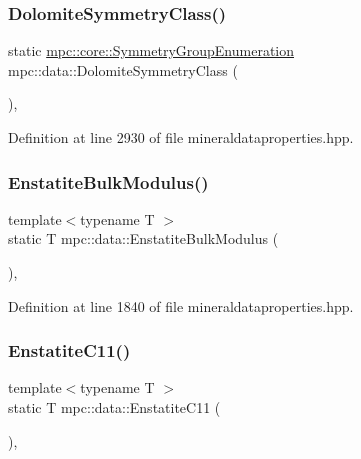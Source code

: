 \subsubsection{\texorpdfstring{Dolomite\+Symmetry\+Class()}{DolomiteSymmetryClass()}}
{\footnotesize\ttfamily static \mbox{\hyperlink{namespacempc_1_1core_a9d979684062547055a0ef5c13077bad8}{mpc\+::core\+::\+Symmetry\+Group\+Enumeration}} mpc\+::data\+::\+Dolomite\+Symmetry\+Class (\begin{DoxyParamCaption}{ }\end{DoxyParamCaption})\hspace{0.3cm}{\ttfamily [inline]}, {\ttfamily [static]}}



Definition at line 2930 of file mineraldataproperties.\+hpp.

\mbox{\label{namespacempc_1_1data_a2fbaa089488566ff8671dd75973d5f0d}} 
\subsubsection{\texorpdfstring{Enstatite\+Bulk\+Modulus()}{EnstatiteBulkModulus()}}
{\footnotesize\ttfamily template$<$typename T $>$ \\
static T mpc\+::data\+::\+Enstatite\+Bulk\+Modulus (\begin{DoxyParamCaption}{ }\end{DoxyParamCaption})\hspace{0.3cm}{\ttfamily [inline]}, {\ttfamily [static]}}



Definition at line 1840 of file mineraldataproperties.\+hpp.

\mbox{\label{namespacempc_1_1data_a815297f57c9e3ddbeb67f22fea054cc5}} 
\subsubsection{\texorpdfstring{Enstatite\+C11()}{EnstatiteC11()}}
{\footnotesize\ttfamily template$<$typename T $>$ \\
static T mpc\+::data\+::\+Enstatite\+C11 (\begin{DoxyParamCaption}{ }\end{DoxyParamCaption})\hspace{0.3cm}{\ttfamily [inline]}, {\ttfamily [static]}}



